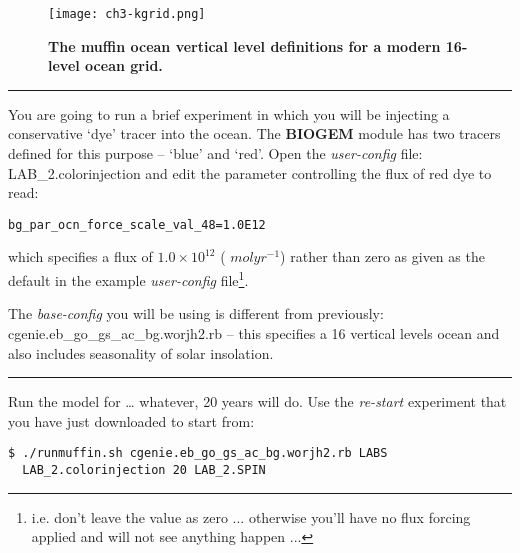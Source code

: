 \documentclass[11pt,fleqn]{book} %
\begin{document}
\begin{figure}
\texttt{[image: ch3-kgrid.png]}\centering
\vspace{-0mm}
\caption{\textbf{The muffin ocean vertical level definitions for a modern 16-level ocean grid.}}
\label{fig:ch3-kgrid}
\end{figure}

\vspace{1mm}
\noindent\rule{4cm}{0.5pt}
\vspace{2mm}

\noindent You are going to run a brief experiment in which you will be injecting a conservative ‘dye’ tracer into the ocean. The \textbf{BIOGEM} module has two tracers defined for this purpose – ‘blue’ and ‘red’. Open the \textit{user-config} file: \textsf{\footnotesize LAB\_2.colorinjection} and edit the parameter controlling the flux of red dye to read:

\vspace{-2mm}
\begin{verbatim}
bg_par_ocn_force_scale_val_48=1.0E12
\end{verbatim}
\vspace{-2mm}

\noindent which specifies a flux of \(1.0\times10^{12}\) ( \(mol yr^{-1}\)) rather than zero as given as the default in the example \textit{user-config} file\footnote{i.e. don't leave the value as zero ... otherwise you'll have no flux forcing applied and will not see anything happen ...}.

The \textit{base-config} you will be using is different from previously: \textsf{\footnotesize cgenie.eb\_go\_gs\_ac\_bg.worjh2.rb} – this specifies a 16 vertical levels ocean and also includes seasonality of solar insolation.

\vspace{1mm}
\noindent\rule{4cm}{0.5pt}
\vspace{2mm}

\newpage 

\noindent Run the model for … whatever, 20 years will do. Use the \textit{re-start} experiment that you have just downloaded to start from:

\vspace{-2mm}
\begin{verbatim}
$ ./runmuffin.sh cgenie.eb_go_gs_ac_bg.worjh2.rb LABS
  LAB_2.colorinjection 20 LAB_2.SPIN
\end{verbatim}
\vspace{-2mm}
\end{document}
